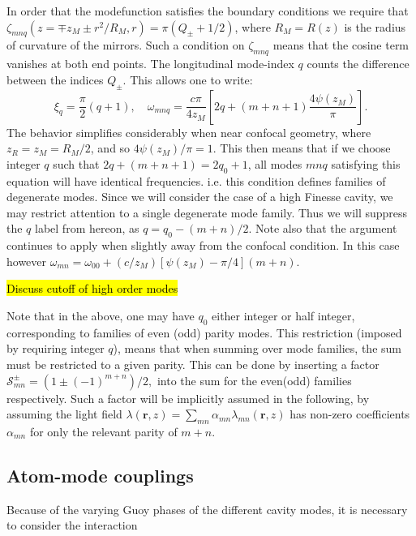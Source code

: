 \documentclass[pra,twocolumn,superscriptaddress]{revtex4-1}
\newcommand{\vect}[1]{\mathbf{#1}}
\newcommand{\light}{\lambda}
\newcommand{\mode}{\lambda}
\newcommand{\sym}{\mathcal{S}^\pm}
\begin{document}
In order that the modefunction satisfies the boundary conditions we
require that $\zeta_{mnq}(z=\mp z_M \pm r^2/R_M,r) = \pi(Q_\pm +
1/2)$, where $R_M=R(z)$ is the radius of curvature of the mirrors.
Such a condition on $\zeta_{mnq}$ means that the cosine term vanishes at
both end points.  The longitudinal mode-index $q$ counts the
difference between the indices $Q_\pm$.  This allows one to write:
\begin{displaymath}
  \xi_q=\frac{\pi}{2}(q+1), \quad
  \omega_{mnq} = \frac{c \pi}{4 z_M} \left[
    2 q + (m+n+1) \frac{4 \psi(z_M)}{\pi} \right].
\end{displaymath}
The behavior simplifies considerably when near confocal geometry,
where $z_R=z_M=R_M/2$, and so $4 \psi(z_M)/\pi=1$.  This then means
that if we choose integer $q$ such that $2q + (m+n+1) = 2 q_0 +1$, all
modes $mnq$ satisfying this equation will have identical frequencies.
i.e. this condition defines families of degenerate modes.  Since we
will consider the case of a high Finesse cavity, we may restrict
attention to a single degenerate mode family.  Thus we will suppress
the $q$ label from hereon, as $q = q_0 - (m+n)/2$.    Note also that the argument continues to
apply when slightly away from the confocal condition.  In this case
however $\omega_{mn} = \omega_{00} + (c /z_M)[\psi(z_M) -
\pi/4](m+n)$.

\hl{Discuss cutoff of high order modes}

Note that in the above, one may have $q_0$ either integer or half
integer, corresponding to families of even (odd) parity modes.  This
restriction (imposed by requiring integer $q$), means that when
summing over mode families, the sum must be restricted to a given
parity.  This can be done by inserting a factor
\begin{math}
  \sym_{mn} = ({1 \pm (-1)^{m+n}})/{2},
\end{math}
into the sum for the even(odd) families respectively.  Such a factor
will be implicitly assumed in the following, by assuming the light
field $\light(\vect{r}, z) =
\sum_{mn} \alpha_{mn} \mode_{mn}(\vect{r},z)$ has non-zero coefficients
$\alpha_{mn}$ for only the relevant parity of $m+n$.

\subsection{Atom-mode couplings}
\label{sec:atom-mode-couplings}

Because of the varying Guoy phases of the different cavity modes, it
is necessary to consider the interaction
\end{document}
